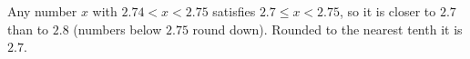 Any number $x$ with $2.74<x<2.75$ satisfies $2.7\le x<2.75$, so it is closer to $2.7$ than to $2.8$ (numbers below $2.75$ round down). Rounded to the nearest tenth it is $\boxed{2.7}$.
